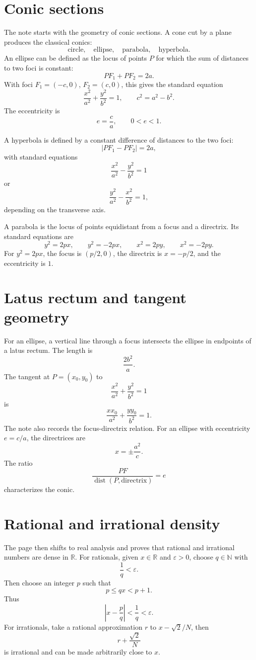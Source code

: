 
\section{Conic sections}

The note starts with the geometry of conic sections.  A cone cut by a plane produces the classical conics:
\[
  \text{circle},\quad \text{ellipse},\quad \text{parabola},\quad \text{hyperbola}.
\]
An ellipse can be defined as the locus of points \(P\) for which the sum of distances to two foci is constant:
\[
  PF_1+PF_2=2a.
\]
With foci \(F_1=(-c,0)\), \(F_2=(c,0)\), this gives the standard equation
\[
  \frac{x^2}{a^2}+\frac{y^2}{b^2}=1,\qquad c^2=a^2-b^2.
\]
The eccentricity is
\[
  e=\frac ca,\qquad 0<e<1.
\]

A hyperbola is defined by a constant difference of distances to the two foci:
\[
  |PF_1-PF_2|=2a,
\]
with standard equations
\[
  \frac{x^2}{a^2}-\frac{y^2}{b^2}=1
\]
or
\[
  \frac{y^2}{a^2}-\frac{x^2}{b^2}=1,
\]
depending on the transverse axis.

A parabola is the locus of points equidistant from a focus and a directrix.  Its standard equations are
\[
  y^2=2px,\qquad y^2=-2px,\qquad x^2=2py,\qquad x^2=-2py.
\]
For \(y^2=2px\), the focus is \((p/2,0)\), the directrix is \(x=-p/2\), and the eccentricity is \(1\).

\section{Latus rectum and tangent geometry}

For an ellipse, a vertical line through a focus intersects the ellipse in endpoints of a latus rectum.  The length is
\[
  \frac{2b^2}{a}.
\]
The tangent at \(P=(x_0,y_0)\) to
\[
  \frac{x^2}{a^2}+\frac{y^2}{b^2}=1
\]
is
\[
  \frac{xx_0}{a^2}+\frac{yy_0}{b^2}=1.
\]
The note also records the focus-directrix relation.  For an ellipse with eccentricity \(e=c/a\), the directrices are
\[
  x=\pm\frac{a^2}{c}.
\]
The ratio
\[
  \frac{PF}{\operatorname{dist}(P,\text{directrix})}=e
\]
characterizes the conic.

\section{Rational and irrational density}

The page then shifts to real analysis and proves that rational and irrational numbers are dense in \(\mathbb R\).  For rationals, given \(x\in\mathbb R\) and \(\varepsilon>0\), choose \(q\in\mathbb N\) with
\[
  \frac1q<\varepsilon.
\]
Then choose an integer \(p\) such that
\[
  p\le qx<p+1.
\]
Thus
\[
  \left|x-\frac pq\right|<\frac1q<\varepsilon.
\]
For irrationals, take a rational approximation \(r\) to \(x-\sqrt2/N\), then
\[
  r+\frac{\sqrt2}{N}
\]
is irrational and can be made arbitrarily close to \(x\).

